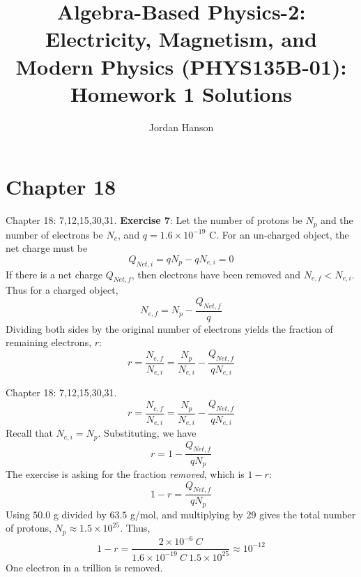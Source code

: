 \documentclass{beamer}
\title{Algebra-Based Physics-2: Electricity, Magnetism, and Modern Physics (PHYS135B-01): Homework 1 Solutions}
\author{Jordan Hanson}
\institute{Whittier College Department of Physics and Astronomy}
\begin{document}
\maketitle

\section{Chapter 18}

\begin{frame}{Chapter 18: 7,12,15,30,31.}
\small
\textbf{Exercise 7}: Let the number of protons be $N_p$ and the number of electrons be $N_e$, and $q = 1.6\times 10^{-19}$ C.  For an un-charged object, the net charge must be
\begin{equation}
Q_{Net,i} = qN_{p} - qN_{e,i} = 0
\end{equation}
If there is a net charge $Q_{Net,f}$, then electrons have been removed and $N_{e,f} < N_{e,i}$.  Thus for a charged object,
\begin{equation}
N_{e,f} = N_p - \frac{Q_{Net,f}}{q}
\end{equation}
Dividing both sides by the original number of electrons yields the fraction of remaining electrons, $r$:
\begin{equation}
r = \frac{N_{e,f}}{N_{e,i}} = \frac{N_p}{N_{e,i}} - \frac{Q_{Net,f}}{qN_{e,i}}
\end{equation}
\end{frame}

\begin{frame}{Chapter 18: 7,12,15,30,31.}
\small
\begin{equation}
r = \frac{N_{e,f}}{N_{e,i}} = \frac{N_p}{N_{e,i}} - \frac{Q_{Net,f}}{qN_{e,i}}
\end{equation}
Recall that $N_{e,i} = N_p$.  Substituting, we have
\begin{equation}
r = 1 - \frac{Q_{Net,f}}{qN_p}
\end{equation}
The exercise is asking for the fraction \textit{removed}, which is $1-r$:
\begin{equation}
1-r = \frac{Q_{Net,f}}{qN_p}
\end{equation}
Using $50.0$ g divided by $63.5$ g/mol, and multiplying by 29 gives the total number of protons, $N_p \approx 1.5 \times 10^{25}$.  Thus,
\begin{equation}
1-r = \frac{2\times 10^{-6}~C}{1.6\times 10^{-19} ~C~ 1.5 \times 10^{25}} \approx 10^{-12}
\end{equation}
One electron in a trillion is removed.
\end{frame}
\end{document}
